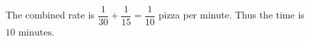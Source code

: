The combined rate is $\dfrac{1}{30}+\dfrac{1}{15}=\dfrac{1}{10}$ pizza per minute. Thus the time is $\boxed{10\text{ minutes}}$.
